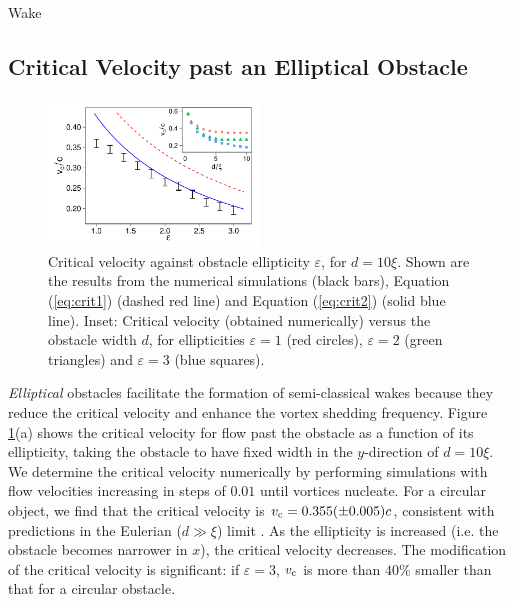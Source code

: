 \begin{chapter}{\label{cha:wake}Wake}
\subsection{Critical Velocity past an Elliptical Obstacle}
\label{sec:crit_vel}
\begin{figure}
\centering
\includegraphics[width=0.5\textwidth]{wake/figure4} 
\caption{\label{fig:velplots}Critical velocity against obstacle ellipticity $\varepsilon$, for $d=10\xi$.  Shown are the results from the numerical simulations (black bars), Equation (\ref{eq:crit1}) (dashed red line) and Equation (\ref{eq:crit2}) (solid blue line). Inset: Critical velocity (obtained numerically) versus the obstacle width $d$, for ellipticities $\varepsilon=1$ (red circles), $\varepsilon=2$ (green triangles) and $\varepsilon=3$ (blue squares).
}
\end{figure}
{\em Elliptical} obstacles facilitate the formation of semi-classical wakes because they reduce the critical velocity and enhance the vortex shedding frequency.  Figure \ref{fig:velplots}(a) shows the critical velocity for flow past the obstacle as a function of its ellipticity, taking the obstacle to have fixed width in the $y$-direction of $d=10\xi$.  We determine the critical velocity numerically by performing simulations with flow velocities increasing in steps of $0.01$ until vortices nucleate.  
For a circular object, we find that the critical velocity is $v_{\rm c}=0.355 (\pm 0.005)c$, consistent with predictions in the Eulerian ($d \gg \xi$) limit \cite{berloff2000,rica2001,pham2004}.  As the ellipticity is increased (i.e. the obstacle becomes narrower in $x$), the critical velocity decreases.  The modification of the critical velocity is significant: if $\varepsilon=3$, $v_{\rm c}$ is more than $40\%$ smaller than that for a circular obstacle. 


\end{chapter}
